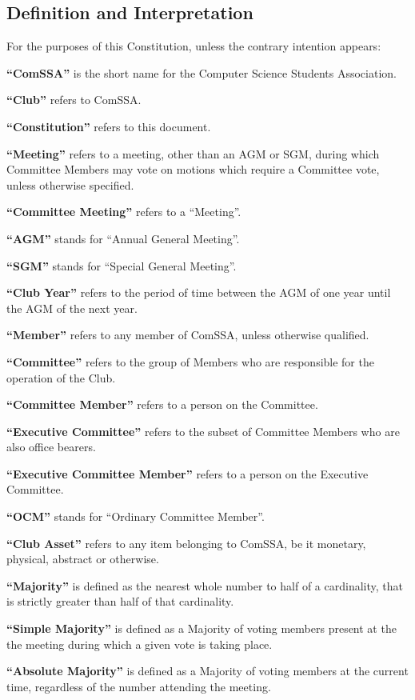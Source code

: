 \documentclass[a4paper,12pt]{article}
\begin{document}
\subsection{Definition and Interpretation}

For the purposes of this Constitution, unless the contrary intention appears:

\textbf{``ComSSA''} is the short name for the Computer Science Students Association.

\textbf{``Club''} refers to ComSSA.

\textbf{``Constitution''} refers to this document.

\textbf{``Meeting''} refers to a meeting, other than an AGM or SGM, during which Committee Members may vote on motions which require a Committee vote, unless otherwise specified.

\textbf{``Committee Meeting''} refers to a ``Meeting''.

\textbf{``AGM''} stands for ``Annual General Meeting''.

\textbf{``SGM''} stands for ``Special General Meeting''.

\textbf{``Club Year''} refers to the period of time between the AGM of one year until the AGM of the next year.

\textbf{``Member''} refers to any member of ComSSA, unless otherwise qualified.

\textbf{``Committee''} refers to the group of Members who are responsible for the operation of the Club.

\textbf{``Committee Member''} refers to a person on the Committee.

\textbf{``Executive Committee''} refers to the subset of Committee Members who are also office bearers.

\textbf{``Executive Committee Member''} refers to a person on the Executive Committee.

\textbf{``OCM''} stands for ``Ordinary Committee Member''.

\textbf{``Club Asset''} refers to any item belonging to ComSSA, be it monetary, physical, abstract or otherwise.

\textbf{``Majority''} is defined as the nearest whole number to half of a cardinality, that is strictly greater than half of that cardinality.

\textbf{``Simple Majority''} is defined as a Majority of voting members present at the the meeting during which a given vote is taking place.

\textbf{``Absolute Majority''} is defined as a Majority of voting members at the current time, regardless of the number attending the meeting.
\end{document}
